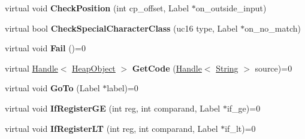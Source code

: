 \begin{DoxyCompactItemize}
\item 
\hypertarget{classv8_1_1internal_1_1_reg_exp_macro_assembler_a4c406af801c7c327c7347e45245e1c04}{}virtual void {\bfseries Check\+Position} (int cp\+\_\+offset, Label $\ast$on\+\_\+outside\+\_\+input)\label{classv8_1_1internal_1_1_reg_exp_macro_assembler_a4c406af801c7c327c7347e45245e1c04}

\item 
\hypertarget{classv8_1_1internal_1_1_reg_exp_macro_assembler_a5cc1361e1eca93c810bfc031bb2557aa}{}virtual bool {\bfseries Check\+Special\+Character\+Class} (uc16 type, Label $\ast$on\+\_\+no\+\_\+match)\label{classv8_1_1internal_1_1_reg_exp_macro_assembler_a5cc1361e1eca93c810bfc031bb2557aa}

\item 
\hypertarget{classv8_1_1internal_1_1_reg_exp_macro_assembler_a0a9cebd794b4db9b3561ef1c2193887e}{}virtual void {\bfseries Fail} ()=0\label{classv8_1_1internal_1_1_reg_exp_macro_assembler_a0a9cebd794b4db9b3561ef1c2193887e}

\item 
\hypertarget{classv8_1_1internal_1_1_reg_exp_macro_assembler_abcd2973036a4f070c0fccf2ed45af9ce}{}virtual \hyperlink{classv8_1_1internal_1_1_handle}{Handle}$<$ \hyperlink{classv8_1_1internal_1_1_heap_object}{Heap\+Object} $>$ {\bfseries Get\+Code} (\hyperlink{classv8_1_1internal_1_1_handle}{Handle}$<$ \hyperlink{classv8_1_1internal_1_1_string}{String} $>$ source)=0\label{classv8_1_1internal_1_1_reg_exp_macro_assembler_abcd2973036a4f070c0fccf2ed45af9ce}

\item 
\hypertarget{classv8_1_1internal_1_1_reg_exp_macro_assembler_ae917b8d08e28a52204d8e3cfb65ae21e}{}virtual void {\bfseries Go\+To} (Label $\ast$label)=0\label{classv8_1_1internal_1_1_reg_exp_macro_assembler_ae917b8d08e28a52204d8e3cfb65ae21e}

\item 
\hypertarget{classv8_1_1internal_1_1_reg_exp_macro_assembler_af9c100b024fc5106d78164a6ad832581}{}virtual void {\bfseries If\+Register\+G\+E} (int reg, int comparand, Label $\ast$if\+\_\+ge)=0\label{classv8_1_1internal_1_1_reg_exp_macro_assembler_af9c100b024fc5106d78164a6ad832581}

\item 
\hypertarget{classv8_1_1internal_1_1_reg_exp_macro_assembler_a903c065fc63c4c470c3fab190f732691}{}virtual void {\bfseries If\+Register\+L\+T} (int reg, int comparand, Label $\ast$if\+\_\+lt)=0\label{classv8_1_1internal_1_1_reg_exp_macro_assembler_a903c065fc63c4c470c3fab190f732691}


\end{DoxyCompactItemize}
